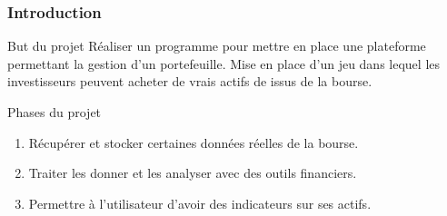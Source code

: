 
\begin{frame}
    \frametitle{Introduction}    		
    \begin{block}{But du projet}
	\center
	Réaliser un programme pour mettre en place une plateforme permettant la gestion d'un portefeuille. Mise en place d'un jeu dans lequel les investisseurs peuvent acheter de vrais actifs de issus de la bourse.
    \end{block}

    \begin{block}{Phases du projet}
	\begin{enumerate}
	 \item Récupérer et stocker certaines données réelles de la bourse.
	 \item Traiter les donner et les analyser avec des outils financiers.
	 \item Permettre à l'utilisateur d'avoir des indicateurs sur ses actifs.
	\end{enumerate}

    \end{block}

\end{frame}